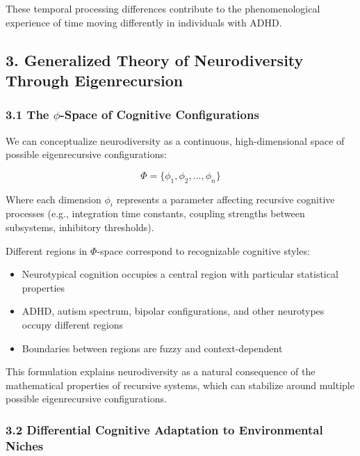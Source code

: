 \documentclass[
]{article}
\providecommand{\tightlist}{%
  \setlength{\itemsep}{0pt}\setlength{\parskip}{0pt}}
\begin{document}
These temporal processing differences contribute to the phenomenological
experience of time moving differently in individuals with ADHD.

\subsection{3. Generalized Theory of Neurodiversity Through
Eigenrecursion}\label{generalized-theory-of-neurodiversity-through-eigenrecursion}

\subsubsection{\texorpdfstring{3.1 The \(\phi\)-Space of Cognitive
Configurations}{3.1 The \textbackslash phi-Space of Cognitive Configurations}}\label{the-phi-space-of-cognitive-configurations}

We can conceptualize neurodiversity as a continuous, high-dimensional
space of possible eigenrecursive configurations:

\[\Phi = \{\phi_1, \phi_2, ..., \phi_n\}\]

Where each dimension \(\phi_i\) represents a parameter affecting
recursive cognitive processes (e.g., integration time constants,
coupling strengths between subsystems, inhibitory thresholds).

Different regions in \(\Phi\)-space correspond to recognizable cognitive
styles:

\begin{itemize}
\tightlist
\item
  Neurotypical cognition occupies a central region with particular
  statistical properties
\item
  ADHD, autism spectrum, bipolar configurations, and other neurotypes
  occupy different regions
\item
  Boundaries between regions are fuzzy and context-dependent
\end{itemize}

This formulation explains neurodiversity as a natural consequence of the
mathematical properties of recursive systems, which can stabilize around
multiple possible eigenrecursive configurations.

\subsubsection{3.2 Differential Cognitive Adaptation to Environmental
Niches}\label{differential-cognitive-adaptation-to-environmental-niches}
\end{document}
